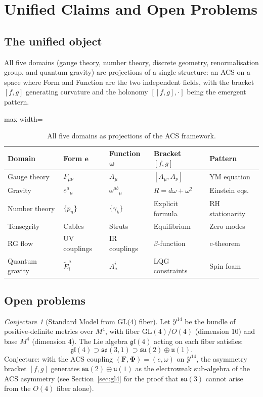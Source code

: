 \documentclass[12pt,a4paper]{article}
\theoremstyle{plain}
\theoremstyle{definition}
\theoremstyle{remark}
\newtheorem{conjecture}[theorem]{Conjecture}
\newcommand{\FormF}{\mathbf{F}}
\newcommand{\FuncF}{\boldsymbol{\Phi}}
\providecommand{\Form}{\mathbf{e}}
\providecommand{\Func}{\boldsymbol{\omega}}
\begin{document}
\section{Unified Claims and Open Problems}
\label{sec:unified}

\subsection{The unified object}

All five domains (gauge theory, number theory, discrete geometry, renormalisation group, and quantum gravity) are projections of a single structure: an ACS on a space where 
Form and Function are the two independent fields, with the bracket 
$[f, g]$ generating curvature and the holonomy $[[f,g],\cdot]$ 
being the emergent pattern.

\begin{table}[h]
\centering
\begin{adjustbox}{max width=\linewidth}\begin{tabular}{lllll}
\toprule
Domain & Form $\Form$ & Function $\Func$ & Bracket $[f,g]$ & Pattern \\
\midrule
Gauge theory & $F_{\mu\nu}$ & $A_\mu$ & $[A_\mu, A_\nu]$ & YM equation \\
Gravity & $e^a{}_\mu$ & $\omega^{ab}{}_\mu$ & $R = d\omega + \omega^2$ & Einstein eqs.\ \\
Number theory & $\{p_n\}$ & $\{\gamma_k\}$ & Explicit formula & RH stationarity \\
Tensegrity & Cables & Struts & Equilibrium & Zero modes \\
RG flow & UV couplings & IR couplings & $\beta$-function & $c$-theorem \\
Quantum gravity & $\tilde{E}^a_i$ & $A^i_a$ & LQG constraints & Spin foam \\
\bottomrule
\end{tabular}\end{adjustbox}
\caption{All five domains as projections of the ACS framework.}
\end{table}

\subsection{Open problems}

\begin{conjecture}[Standard Model from GL(4) fiber]\label{conj:SM}
Let $\mathcal{Y}^{14}$ be the bundle of positive-definite metrics over $M^4$, 
with fiber $\mathrm{GL}(4)/O(4)$ (dimension 10) and base $M^4$ (dimension 4).  
The Lie algebra $\mathfrak{gl}(4)$ acting on each fiber satisfies:
\[
  \mathfrak{gl}(4) \supset \mathfrak{so}(3,1) \supset 
  \mathfrak{su}(2) \oplus \mathfrak{u}(1).
\]
Conjecture: with the ACS coupling $(\FormF, \FuncF) = (e, \omega)$ on 
$\mathcal{Y}^{14}$, the asymmetry bracket $[f, g]$ generates 
$\mathfrak{su}(2) \oplus \mathfrak{u}(1)$ 
as the electroweak sub-algebra of the ACS asymmetry 
(see Section~\ref{sec:gl4} for the proof that $\mathfrak{su}(3)$ 
cannot arise from the $O(4)$ fiber alone).
\end{conjecture}
\end{document}
